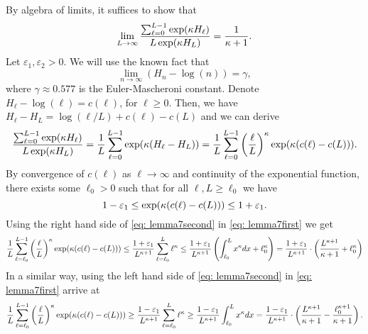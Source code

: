 By algebra of limits, it suffices to show that
    \begin{equation*}
        \lim_{L \rightarrow \infty} \frac{\sum_{\ell = 0}^{L-1} \exp(\kappa H_{\ell})}{L \exp(\kappa H_L)} = \frac{1}{\kappa + 1}.
    \end{equation*}
    Let $\varepsilon_1, \varepsilon_2 > 0$. We will use the known fact that
\begin{equation*}
    \lim_{n \rightarrow \infty} \left(H_n - \log(n)\right) = \gamma,
\end{equation*}
where $\gamma \approx 0.577$ is the Euler-Mascheroni constant. Denote $H_\ell - \log(\ell) = c(\ell)$, for $\ell \geq 0$. Then, we have $H_\ell - H_L = \log(\ell/L) + c(\ell) - c(L)$ and we can derive
    \begin{equation}
        \label{eq: lemma7first}
         \frac{\sum_{\ell=0}^{L-1} \exp( \kappa H_{\ell})}{L \exp(\kappa H_L)} = \frac{1}{L} \sum_{\ell=0}^{L-1} \exp(\kappa (H_\ell - H_L)) = \frac{1}{L} \sum_{\ell=0}^{L-1} \left(\frac{\ell}{L}\right)^{\kappa} \exp(\kappa (c(\ell)- c(L))).
    \end{equation}
    By convergence of $c(\ell)$ as $\ell \rightarrow \infty$ and continuity of the exponential function, there exists some $\ell_0 > 0$ such that for all $\ell, L \geq \ell_0$ we have
    \begin{equation}
        \label{eq: lemma7second}
        1- \varepsilon_1 \leq \exp(\kappa(c(\ell)- c(L))) \leq 1 + \varepsilon_1.
    \end{equation}
    Using the right hand side of \eqref{eq: lemma7second} in \eqref{eq: lemma7first} we get
    \begin{equation*}
        \frac{1}{L} \sum_{\ell=\ell_0}^{L-1} \left(\frac{\ell}{L}\right)^{\kappa} \exp(\kappa (c(\ell)- c(L))) \leq  \frac{1+\varepsilon_1}{L^{\kappa + 1}} \sum_{\ell=\ell_0}^L \ell^{\kappa} \leq \frac{1+\varepsilon_1}{L^{\kappa + 1}} \left( \int_{\ell_0}^L x^{\kappa} dx + \ell_0^{\kappa} \right) = \frac{1+\varepsilon_1}{L^{\kappa + 1}} \cdot \left( \frac{L^{\kappa + 1}}{\kappa + 1} + \ell_0^{\kappa} \right)
    \end{equation*}
    In a similar way, using the left hand side of \eqref{eq: lemma7second} in \eqref{eq: lemma7first} arrive at
    \begin{equation*}
        \frac{1}{L} \sum_{\ell=\ell_0}^{L-1} \left(\frac{\ell}{L}\right)^{\kappa} \exp(\kappa (c(\ell)- c(L))) \geq  \frac{1-\varepsilon_1}{L^{\kappa + 1}} \sum_{\ell=\ell_0}^L \ell^{\kappa} \geq \frac{1-\varepsilon_1}{L^{\kappa + 1}} \int_{\ell_0}^L x^{\kappa} dx = \frac{1-\varepsilon_1}{L^{\kappa + 1}} \cdot \left( \frac{L^{\kappa + 1}}{\kappa + 1} - \frac{\ell_0^{\kappa+1}}{\kappa+1} \right).
    \end{equation*}
